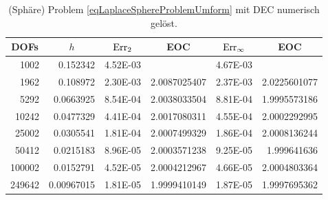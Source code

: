 \begin{beispiel}[Einheitssphäre]
       \begin{table}[htbp]
       \centering
       \begin{tabular}{|r|r|r|r|r|r|}
       \hline
       \multicolumn{1}{|c|}{DOFs} & \multicolumn{1}{c|}{\( h \)} & \multicolumn{1}{c|}{\( \text{Err}_{2} \)} & \multicolumn{1}{c|}{EOC} &
       \multicolumn{1}{c|}{ \( \text{Err}_{\infty} \)} & \multicolumn{1}{c|}{EOC} \\ \hline
        1002 & 0.152342 & 4.52E-03 & \multicolumn{1}{l|}{} & 4.67E-03 & \multicolumn{1}{l|}{} \\ \hline
        1962 & 0.108972 & 2.30E-03 & 2.0087025407 & 2.37E-03 & 2.0225601077 \\ \hline
        5292 & 0.0663925 & 8.54E-04 & 2.0038033504 & 8.81E-04 & 1.9995573186 \\ \hline
        10242 & 0.0477329 & 4.41E-04 & 2.0017080311 & 4.55E-04 & 2.0002292995 \\ \hline
        25002 & 0.0305541 & 1.81E-04 & 2.0007499329 & 1.86E-04 & 2.0008136244 \\ \hline
        50412 & 0.0215183 & 8.96E-05 & 2.0003571238 & 9.25E-05 & 1.999641636 \\ \hline
        100002 & 0.0152791 & 4.52E-05 & 2.0004212967 & 4.66E-05 & 2.0004803364 \\ \hline
        249642 & 0.00967015 & 1.81E-05 & 1.9999410149 & 1.87E-05 & 1.9997695362 \\ \hline
       \end{tabular}
       \caption[Laplace auf Sphäre (DEC)]{(Sphäre) Problem \eqref{eqLaplaceSphereProblemUmform} mit DEC numerisch gelöst.}
       \label{tabLaplaceSphereDEC}
       \end{table}
       

\end{beispiel}
